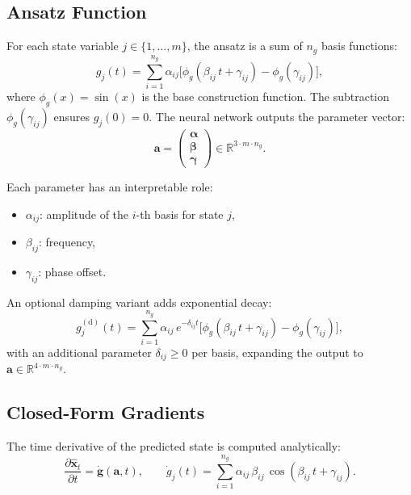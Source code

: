 \documentclass[11pt]{article}
\newcommand{\R}{\mathbb{R}}
\newcommand{\xhat}{\hat{\bm{x}}}
\newcommand{\avec}{\bm{a}}
\newcommand{\phig}{\phi_g}
\begin{document}
\subsection{Ansatz Function}

For each state variable $j \in \{1, \ldots, m\}$, the ansatz is a sum of $n_g$ basis functions:
\begin{equation}
    g_j(t) = \sum_{i=1}^{n_g} \alpha_{ij} \Big[ \phig(\beta_{ij}\, t + \gamma_{ij}) - \phig(\gamma_{ij}) \Big],
    \label{eq:ansatz}
\end{equation}
where $\phig(x) = \sin(x)$ is the base construction function. The subtraction $\phig(\gamma_{ij})$ ensures $g_j(0) = 0$. The neural network outputs the parameter vector:
\begin{equation}
    \avec = \begin{pmatrix} \bm{\alpha} \\ \bm{\beta} \\ \bm{\gamma} \end{pmatrix} \in \R^{3 \cdot m \cdot n_g}.
    \label{eq:param-vector}
\end{equation}

Each parameter has an interpretable role:
\begin{itemize}
    \item $\alpha_{ij}$: amplitude of the $i$-th basis for state $j$,
    \item $\beta_{ij}$: frequency,
    \item $\gamma_{ij}$: phase offset.
\end{itemize}

An optional damping variant adds exponential decay:
\begin{equation}
    g_j^{(\mathrm{d})}(t) = \sum_{i=1}^{n_g} \alpha_{ij}\, e^{-\delta_{ij} t} \Big[ \phig(\beta_{ij}\, t + \gamma_{ij}) - \phig(\gamma_{ij}) \Big],
    \label{eq:ansatz-damped}
\end{equation}
with an additional parameter $\delta_{ij} \geq 0$ per basis, expanding the output to $\avec \in \R^{4 \cdot m \cdot n_g}$.

\subsection{Closed-Form Gradients}

The time derivative of the predicted state is computed analytically:
\begin{equation}
    \frac{\partial \xhat_t}{\partial t} = \dot{\bm{g}}(\avec, t), \qquad
    \dot{g}_j(t) = \sum_{i=1}^{n_g} \alpha_{ij}\, \beta_{ij}\, \cos(\beta_{ij}\, t + \gamma_{ij}).
    \label{eq:closed-form-grad}
\end{equation}
\end{document}
